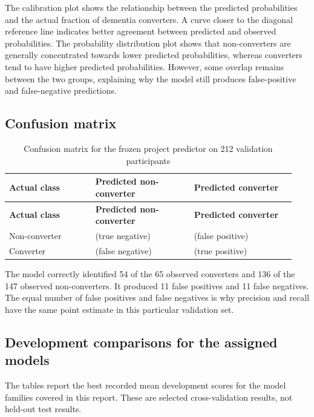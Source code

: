 \documentclass[11pt,a4paper]{article}
\begin{document}
The calibration plot shows the relationship between the predicted probabilities and the actual fraction of dementia converters. A curve closer to the diagonal reference line indicates better agreement between predicted and observed probabilities. The probability distribution plot shows that non-converters are generally concentrated towards lower predicted probabilities, whereas converters tend to have higher predicted probabilities. However, some overlap remains between the two groups, explaining why the model still produces false-positive and false-negative predictions.

\subsection{Confusion matrix}
\begingroup\small\renewcommand{\arraystretch}{1.16}
\begin{longtable}{@{}>{\raggedright\arraybackslash}p{0.29\linewidth}>{\raggedright\arraybackslash}p{0.32\linewidth}>{\raggedright\arraybackslash}p{0.33\linewidth}@{}}
\caption{Confusion matrix for the frozen project predictor on 212 validation participants}\\
\toprule \textbf{Actual class} & \textbf{Predicted non-converter} & \textbf{Predicted converter}\\\midrule\endfirsthead
\toprule \textbf{Actual class} & \textbf{Predicted non-converter} & \textbf{Predicted converter}\\\midrule\endhead
\midrule\endfoot\bottomrule\endlastfoot
Non-converter & 136 (true negative) & 11 (false positive)\\
Converter & 11 (false negative) & 54 (true positive)\\
\end{longtable}\endgroup
The model correctly identified 54 of the 65 observed converters and 136 of the 147 observed non-converters. It produced 11 false positives and 11 false negatives. The equal number of false positives and false negatives is why precision and recall have the same point estimate in this particular validation set.

\subsection{Development comparisons for the assigned models}
The tables report the best recorded mean development scores for the model families covered in this report. These are selected cross-validation results, not held-out test results.
\end{document}
